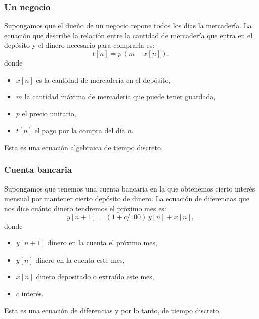 \documentclass[11pt,a4paper,openany]{book}
\begin{document}
\subsubsection{Un negocio}
Supongamos que el dueño de un negocio repone todos los días la mercadería. La ecuación que describe la relación entre la cantidad de mercadería que entra en el depósito y el dinero necesario para comprarla es:
\begin{equation}
	t[n] = p \, (m - x[n]).
\end{equation}
donde
\begin{itemize}
	\item $x[n]$ es la cantidad de mercadería en el depósito,
	\item $m$ la cantidad máxima de mercadería que puede tener guardada,
	\item $p$ el precio unitario,
	\item $t[n]$ el pago por la compra del día $n$.
\end{itemize}
Esta es una ecuación algebraica de tiempo discreto.

\subsubsection{Cuenta bancaria}
Supongamos que tenemos una cuenta bancaria en la que obtenemos cierto interés mensual por mantener cierto depósito de dinero. La ecuación de diferencias que nos dice cuánto dinero tendremos el próximo mes es:
\begin{equation}
	y[n+1] = (1 + c/100) \, y[n] + x[n],
\end{equation}
donde
\begin{itemize}
	\item $y[n+1]$ dinero en la cuenta el próximo mes,
	\item $y[n]$ dinero en la cuenta este mes,
	\item $x[n]$ dinero depositado o extraído este mes,
	\item $c$ interés.
\end{itemize}
Esta es una ecuación de diferencias y por lo tanto, de tiempo discreto.
\end{document}
